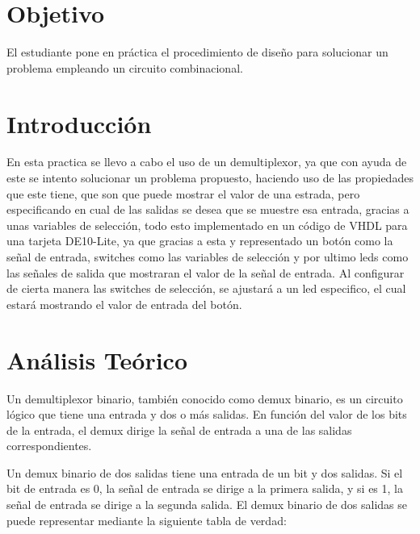 \documentclass{article}
\begin{document}
\begin{abstract}
	\begin{justify}
		Se realizo un demux en donde recibe como entrada los tres selectores que para la tarjeta de desarrollo son los switches que uno asigna en el pin planner, de ahí se configuro otro input
		el cual es un botón para mostrar el resultado que ejerce el demux donde la salida tiene que mostrar el número correspondiente con respecto a los switches. 
		\end{justify}
{\it Keywords:}   demultiplexor, switches 
\end{abstract}
\begin{multicols}{2}
\section{Objetivo}\label{Objetivo}
El estudiante pone en práctica el procedimiento de diseño para solucionar un 
problema empleando un circuito combinacional.
\section{Introducción}\label{sec:intro}
En esta practica se llevo a cabo el uso de un demultiplexor, ya que con ayuda de este se intento solucionar un problema propuesto, haciendo uso de las propiedades que este tiene, que son que puede mostrar el valor de una estrada, pero especificando en cual de las salidas se desea que se muestre esa entrada, gracias a unas variables de selección, todo esto implementado en un código de VHDL para una tarjeta DE10-Lite, ya que gracias a esta y representado un botón como la señal de entrada, switches como las variables de selección  y por ultimo leds como las señales de salida que mostraran el valor de la señal de entrada. Al configurar de cierta manera las switches de selección, se ajustará a un led especifico, el cual estará mostrando el valor de entrada del botón. 
\section{Análisis Teórico}\label{sec:analiTeorico}

Un demultiplexor binario, también conocido como demux binario, es un circuito lógico que tiene una entrada y dos o más salidas. En función del valor de los bits de la entrada, el demux dirige la señal de entrada a una de las salidas correspondientes.

Un demux binario de dos salidas tiene una entrada de un bit y dos salidas. Si el bit de entrada es 0, la señal de entrada se dirige a la primera salida, y si es 1, la señal de entrada se dirige a la segunda salida. El demux binario de dos salidas se puede representar mediante la siguiente tabla de verdad:


\end{multicols}
\end{document}
